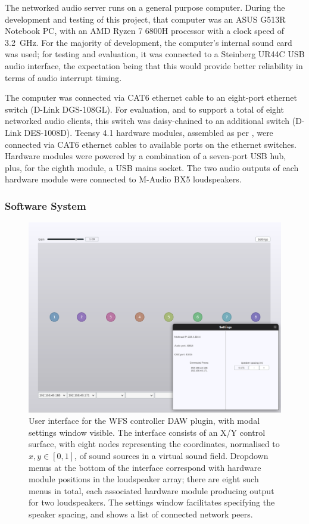 The networked audio server runs on a general purpose computer.
During the development and testing of this project, that computer was an ASUS
G513R Notebook PC, with an AMD Ryzen 7 6800H processor with a clock
speed of \qty{3.2}{\GHz}.
For the majority of development, the computer's internal sound card was used;
for testing and evaluation, it was connected to a Steinberg UR44C USB audio
interface, the expectation being that this would provide better reliability in
terms of audio interrupt timing.

The computer was connected via CAT6 ethernet cable to an eight-port ethernet
switch (D-Link DGS-108GL).
For evaluation, and to support a total of eight networked audio clients, this
switch was daisy-chained to an additional switch (D-Link DES-1008D).
Teensy 4.1 hardware modules, assembled as per , were
connected via CAT6 ethernet cables to available ports on the ethernet switches.
Hardware modules were powered by a combination of a seven-port USB hub, plus,
for the eighth module, a USB mains socket.
The two audio outputs of each hardware module were connected to M-Audio BX5
loudspeakers.

\subsubsection{Software System}\label{subsubsec:software-system}

\begin{figure}[ht]
    \centering
    \includegraphics[width=\textwidth]{figures/plugin}
    \caption{
        User interface for the WFS controller DAW plugin, with modal
        settings window visible.
        The interface consists of an X/Y control surface, with eight nodes
        representing the coordinates, normalised to $x,y \in [0,1]$, of sound
        sources in a virtual sound field.
        Dropdown menus at the bottom of the interface correspond with hardware
        module positions in the loudspeaker array; there are eight such menus
        in total, each associated hardware module producing output for two
        loudspeakers.
        The settings window facilitates specifying the speaker spacing, and
        shows a list of connected network peers.
    }
    \label{fig:plugin-interface}
\end{figure}

